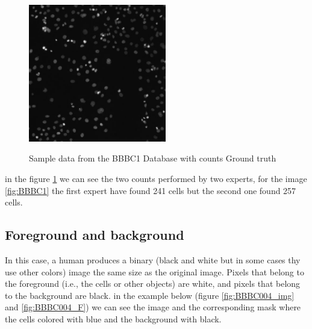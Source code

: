 \begin{figure}[H]
\begin{minipage}[c]{\linewidth}
\centering
\includegraphics[width=60mm]{../images/AS_09125_050118150001_A03f05d0.jpg}
\label{fig:BBBC1}
\end{minipage}

\begin{minipage}[c]{\linewidth}
\centering

\label{fig:BBBC001_Counts}
\end{minipage}
\caption{Sample data from the BBBC1 Database with counts Ground truth}
\end{figure}


in the figure \ref{fig:BBBC001_Counts} we can see the two counts performed by two experts, for the image \ref{fig:BBBC1} the first expert have found 241 cells but the second one found 257 cells.

\subsection{Foreground and background}

In this case, a human produces a binary (black and white but in some cases thy use other colors) image the same size as the original image. Pixels that belong to the foreground (i.e., the cells or other objects) are white, and pixels that belong to the background are black. in the example below (figure \ref{fig:BBBC004_img} and \ref{fig:BBBC004_F}) we can see the image and the corresponding mask where the cells colored with blue and the background with black.

